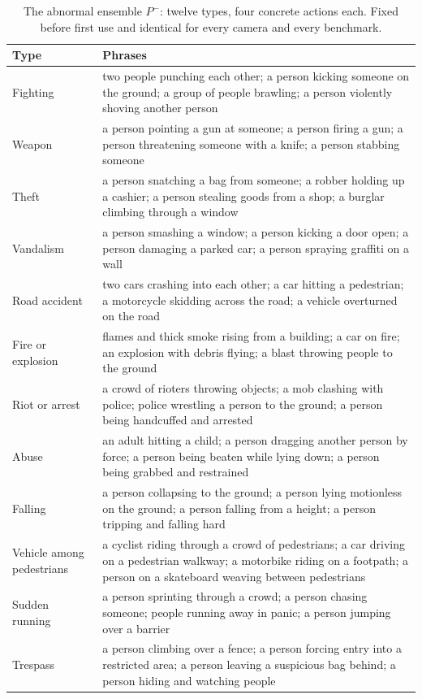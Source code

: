 \documentclass[a4paper,fleqn]{cas-sc}
\begin{document}
\begin{table}[width=\linewidth,cols=2,pos=htbp]
\caption{The abnormal ensemble $P^{-}$: twelve types, four concrete actions each.
Fixed before first use and identical for every camera and every
benchmark.}\label{tbl:bank}
\footnotesize
\begin{tabularx}{\linewidth}{@{}W{2.9cm} Z@{}}
\toprule
\textbf{Type} & \textbf{Phrases} \\
\midrule
Fighting & two people punching each other; a person kicking someone on the ground; a group of people brawling; a person violently shoving another person \\
Weapon & a person pointing a gun at someone; a person firing a gun; a person threatening someone with a knife; a person stabbing someone \\
Theft & a person snatching a bag from someone; a robber holding up a cashier; a person stealing goods from a shop; a burglar climbing through a window \\
Vandalism & a person smashing a window; a person kicking a door open; a person damaging a parked car; a person spraying graffiti on a wall \\
Road accident & two cars crashing into each other; a car hitting a pedestrian; a motorcycle skidding across the road; a vehicle overturned on the road \\
Fire or explosion & flames and thick smoke rising from a building; a car on fire; an explosion with debris flying; a blast throwing people to the ground \\
Riot or arrest & a crowd of rioters throwing objects; a mob clashing with police; police wrestling a person to the ground; a person being handcuffed and arrested \\
Abuse & an adult hitting a child; a person dragging another person by force; a person being beaten while lying down; a person being grabbed and restrained \\
Falling & a person collapsing to the ground; a person lying motionless on the ground; a person falling from a height; a person tripping and falling hard \\
Vehicle among pedestrians & a cyclist riding through a crowd of pedestrians; a car driving on a pedestrian walkway; a motorbike riding on a footpath; a person on a skateboard weaving between pedestrians \\
Sudden running & a person sprinting through a crowd; a person chasing someone; people running away in panic; a person jumping over a barrier \\
Trespass & a person climbing over a fence; a person forcing entry into a restricted area; a person leaving a suspicious bag behind; a person hiding and watching people \\
\bottomrule
\end{tabularx}
\end{table}
\end{document}
